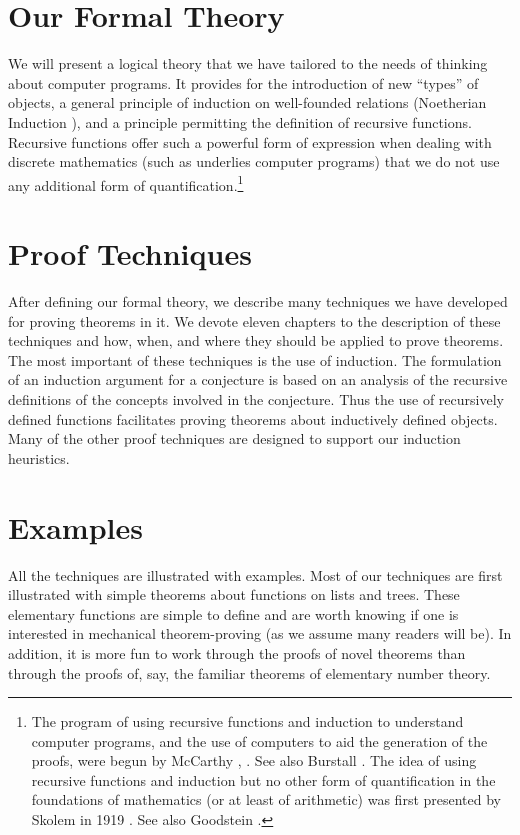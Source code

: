\documentclass[11pt]{book}
\newcommand{\pubdefaulttextsize}{\large}
\begin{document}
\section{Our Formal Theory}
\pubdefaulttextsize
We will present  a logical theory that we have tailored
to the needs of thinking about computer programs.
It provides for the  introduction of new
``types'' of objects, a general principle of induction on well-founded
relations (Noetherian Induction \cite{BOURBAKI}), and a 
principle permitting the definition of recursive
functions.
Recursive functions offer such a powerful form
of expression when dealing with discrete mathematics (such as  underlies
computer programs) that we do not use any additional
form of quantification.\footnote{The program of using recursive functions and induction to understand computer programs, and the use of computers to aid the generation of the proofs, were begun by McCarthy \cite{MCCARTHYCHECKING}, \cite{MCCARTHYBASIS}. See also Burstall \cite{BURSTALL}. The idea of using recursive functions and induction but no other form of quantification in the foundations of mathematics (or at least of arithmetic) was first presented by Skolem in 1919 \cite{SKOLEM}.  See also Goodstein \cite{GOODSTEIN}.}
\section{Proof Techniques}
\pubdefaulttextsize
After defining our formal theory, we describe
many techniques we have developed for proving theorems
in it.  We devote eleven chapters to the description of these
techniques and how, when, and where they should be applied to prove theorems.
The most important of these techniques is the use of induction.  The formulation
of an induction argument for a conjecture is based on an analysis of the
recursive definitions of the concepts involved in the conjecture.  Thus the
use of recursively defined functions facilitates proving theorems
about inductively defined objects.  Many of the other proof techniques
are designed to support our induction heuristics.
\section{Examples}
\pubdefaulttextsize
All the techniques are illustrated with examples.  Most of
our techniques are first illustrated with simple theorems about functions
on lists and trees.
These elementary functions
are simple to define and are worth knowing
if one is interested in mechanical theorem-proving (as we assume many readers will be).  In addition, it
is more fun to work through the proofs of novel theorems than through the proofs
of, say,  the familiar theorems of elementary number theory.
\end{document}
